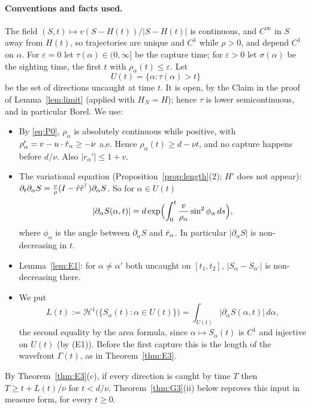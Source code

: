 \paragraph{Conventions and facts used.}
The field $(S,t)\mapsto v(S-H(t))/|S-H(t)|$ is continuous, and $C^\infty$ in $S$ away from $H(t)$, so trajectories are unique and
$C^1$ while $\rho>0$, and depend $C^1$ on $\alpha$. For $\varepsilon=0$ let $\tau(\alpha)\in(0,\infty]$ be the capture time; for
$\varepsilon>0$ let $\sigma(\alpha)$ be the sighting time, the first $t$ with $\rho_\alpha(t)\le\varepsilon$. Let
\[
U(t)=\{\alpha:\tau(\alpha)>t\}
\]
be the set of directions uncaught at time $t$. It is open, by the Claim in the proof of Lemma~\ref{lem:limit} (applied with
$H_N=H$); hence $\tau$ is lower semicontinuous, and in particular Borel. We use:
\begin{itemize}
\item[(P0)] By \eqref{eq:P0}, $\rho_\alpha$ is absolutely continuous while positive, with $\rho_\alpha'=v-u\cdot\hat r_\alpha\ge-\nu$ a.e.
Hence $\rho_\alpha(t)\ge d-\nu t$, and no capture happens before $d/\nu$. Also $|r_\alpha'|\le1+v$.
\item[(V)] The variational equation (Proposition~\ref{prop:length}(2); $H'$ does not appear):
$\partial_t\partial_\alpha S=\frac{v}{\rho}(I-\hat r\hat r^{\!\top})\partial_\alpha S$. So for $\alpha\in U(t)$
\[
|\partial_\alpha S(\alpha,t)|=d\exp\Bigl(\int_0^t\frac{v}{\rho_\alpha}\sin^2\phi_\alpha\,ds\Bigr),
\]
where $\phi_\alpha$ is the angle between $\partial_\alpha S$ and $\hat r_\alpha$. In particular $|\partial_\alpha S|$ is non-decreasing in $t$.
\item[(E1)] Lemma~\ref{lem:E1}: for $\alpha\ne\alpha'$ both uncaught on $[t_1,t_2]$, $|S_\alpha-S_{\alpha'}|$ is non-decreasing there.
\item[(L)] We put
\[
L(t):=\mathcal H^1\bigl(\{S_\alpha(t):\alpha\in U(t)\}\bigr)=\int_{U(t)}|\partial_\alpha S(\alpha,t)|\,d\alpha ,
\]
the second equality by the area formula, since $\alpha\mapsto S_\alpha(t)$ is $C^1$ and injective on $U(t)$ (by (E1)). Before the
first capture this is the length of the wavefront $\Gamma(t)$, as in Theorem~\ref{thm:E3}.
\end{itemize}
By Theorem~\ref{thm:E3}(c), if every direction is caught by time $T$ then $T\ge t+L(t)/\nu$ for $t<d/\nu$. Theorem~\ref{thm:G3}(ii)
below reproves this input in measure form, for every $t\ge0$.

